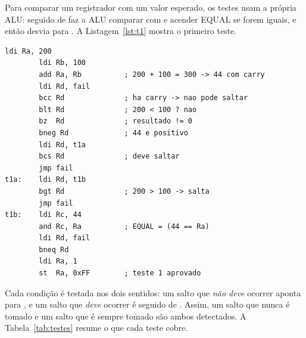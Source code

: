 Para comparar um registrador com um valor esperado, os testes usam a própria
ALU:  seguido de  faz a ALU comparar
 com  e acender EQUAL se forem iguais, e então
 desvia para . A Listagem~\ref{lst:t1} mostra o primeiro
teste.

\begin{lstlisting}[language=asm8, caption={Teste T1 de \texttt{test\_alu.asm}: soma com \emph{carry}.}, label={lst:t1}]
        ldi Ra, 200
        ldi Rb, 100
        add Ra, Rb          ; 200 + 100 = 300 -> 44 com carry
        ldi Rd, fail
        bcc Rd              ; ha carry -> nao pode saltar
        blt Rd              ; 200 < 100 ? nao
        bz  Rd              ; resultado != 0
        bneg Rd             ; 44 e positivo
        ldi Rd, t1a
        bcs Rd              ; deve saltar
        jmp fail
t1a:    ldi Rd, t1b
        bgt Rd              ; 200 > 100 -> salta
        jmp fail
t1b:    ldi Rc, 44
        and Rc, Ra          ; EQUAL = (44 == Ra)
        ldi Rd, fail
        bneq Rd
        ldi Ra, 1
        st  Ra, 0xFF        ; teste 1 aprovado
\end{lstlisting}

Cada condição é testada nos dois sentidos: um salto que \emph{não deve}
ocorrer aponta para , e um salto que \emph{deve} ocorrer é seguido de
. Assim, um salto que nunca é tomado e um salto que é sempre
tomado são ambos detectados. A Tabela~\ref{tab:testes} resume o que cada teste
cobre.

